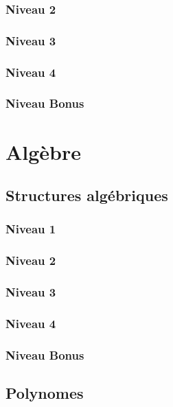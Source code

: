 \documentclass[a4paper]{report}
\begin{document}
			\subsection{Niveau 2}
		
			\subsection{Niveau 3}
			
			\subsection{Niveau 4}
			
			\subsection{Niveau Bonus}
	
	\chapter{Algèbre}
	
		\section{Structures algébriques}
		
			\subsection{Niveau 1}
		
			\subsection{Niveau 2}
		
			\subsection{Niveau 3}
			
			\subsection{Niveau 4}
			
			\subsection{Niveau Bonus}
		
		\section{Polynomes}
		
\end{document}
